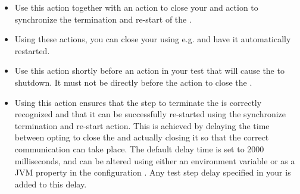 

\begin{itemize}
\item Use this action together with an action to close your \gdaut{} and action to synchronize the termination and re-start of the \gdaut{}. 
\item Using these actions, you can close your \gdaut{} using e.g.  and have it automatically restarted.
\item Use this action shortly before an action in your test that will cause the \gdaut{} to shutdown. It must not be directly before the action to close the \gdaut{}. 
\item Using this action ensures that the step to terminate the \gdaut{} is correctly recognized and that it can be successfully re-started using the synchronize termination and re-start action. This is achieved by delaying the time between opting to close the \gdaut{} and actually closing it so that the correct communication can take place. The default delay time is set to 2000 milliseconds, and can be altered using either an environment variable  or as a JVM property in the \gdaut{} configuration  . Any test step delay specified in your \gdsuite{} is added to this delay.

\end{itemize}




